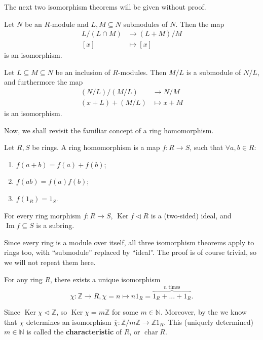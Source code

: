 \documentclass[12pt, a4paper, titlepage]{report}
\DeclareMathOperator{\Ker}{Ker}
\DeclareMathOperator{\Ima}{Im}
\DeclareMathOperator{\chara}{char}
\begin{document}
The next two isomorphism theorems will be given without proof.

\begin{thm}
  \label{thm:sndiso}
  Let $N$ be an $R$-module and $L, M \subseteq N$ submodules of $N$. Then the map
  \begin{align*}
    L \big/ (L \cap M) &\to (L + M) \big/ M\\
    [x] &\mapsto [x]
  \end{align*}
  is an isomorphism.
\end{thm}

\begin{thm}
  \label{thm:thdiso}
  Let $L \subseteq M \subseteq N$ be an inclusion of $R$-modules. Then $M/L$ is a submodule of $N/L$,
  and furthermore the map
  \begin{align*}
    (N/L) \big/ (M/L) &\to N \big/ M\\
    (x + L) + (M/L) &\mapsto x + M
  \end{align*}
  is an isomorphism.
\end{thm}

Now, we shall revisit the familiar concept of a ring homomorphism.

\begin{defn}
  Let $R, S$ be rings. A ring homomorphism is a map $f : R \to S$, such that $\forall a, b \in R$:
  \begin{enumerate}
  \item $f(a+b) = f(a) + f(b)$;
  \item $f(ab) = f(a)f(b)$;
  \item $f(1_R) = 1_S$.
  \end{enumerate}
\end{defn}

\begin{rem}
  For every ring morphism $f : R \to S$, $\Ker f \lhd R$ is a (two-sided) ideal, and $\Ima f \subseteq S$ is a
  subring.
\end{rem}

Since every ring is a module over itself, all three isomorphism theorems apply to rings too, with ``submodule''
replaced by ``ideal''. The proof is of course trivial, so we will not repeat them here.

\begin{exmp}
  For any ring $R$, there exists a unique isomorphism
  \[
    \chi : \mathbb{Z} \to R, \chi = n \mapsto n1_R = \overbrace{1_R + ... + 1_R}^{n \text{ times}}.
  \]
  
  Since $\Ker \chi \lhd \mathbb{Z}$, so $\Ker \chi = m\mathbb{Z}$ for some $m \in \mathbb{N}$.
  Moreover, by the  we know that $\chi$ determines an isomorphism
  $\overline{\chi} : \mathbb{Z}/m\mathbb{Z} \to \mathbb{Z}1_R$. This (uniquely determined) $m \in \mathbb{N}$ is
  called the \textbf{characteristic} of $R$, or $\chara R$.
\end{exmp}
\end{document}
